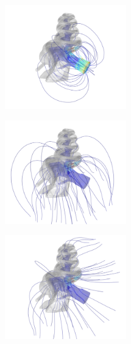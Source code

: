 \begin{figure}
	\centering
	
	\begin{subfigure}[t]{0.32\textwidth}
        \centering
        \includegraphics[height=4.5cm,trim={12mm 0 0 0},clip]
        	{Validation/streamlines-term4-nrvD_gnd-bare}
        \caption{}
        \label{fig:valid_streams_nerve}
    \end{subfigure}%
	\begin{subfigure}[t]{0.34\textwidth}
        \centering
        \includegraphics[height=4.5cm]{Validation/streamlines-term4-caud_gnd-bare}
        \caption{}
        \label{fig:valid_streams_caudal}
    \end{subfigure}%
	\begin{subfigure}[t]{0.34\textwidth}
        \centering
        \includegraphics[height=4.5cm]{Validation/streamlines-term4-hemi_gnd-bare}
        \caption{}
        \label{fig:valid_streams_hemi}
    \end{subfigure}\\%
    \vspace{0.5em}\hspace{1cm}%

\end{figure}
